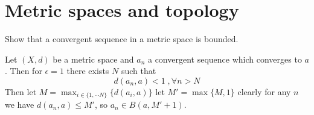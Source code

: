 \section{Metric spaces and topology}\label{p:metric-spaces}

\begin{problem}
Show that a convergent sequence in a metric space is bounded.
\begin{solution}
Let $(X,d)$ be a metric space and $a_n$ a convergent sequence which converges to $a$. Then for $\epsilon = 1$ there exists $N$ such that \[d(a_n,a) < 1 \; , \forall n>N\]
    Then let $M = \max_{i\in \{1,\cdots N\}}\{d(a_i,a)\}$ let $M' = \max\{M,1\}$ clearly for any $n$ we have $d(a_n,a)\leq M'$, so $a_n \in B(a,M'+1)$.
\end{solution}
\end{problem}

